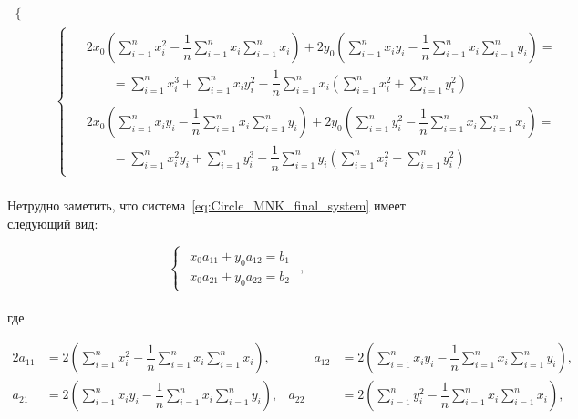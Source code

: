 \begin{align}
\begin{cases}
\begin{aligned}
         \end{aligned}
    \end{cases} \\
    &\begin{cases}
         \label{eq:Circle_MNK_final_system}
         \begin{aligned}
             &2 x_0 \left( \sum_{i=1}^{n} x_i^2 - \dfrac{1}{n} \sum_{i=1}^{n} x_i \sum_{i=1}^{n} x_i \right)
             + 2 y_0 \left( \sum_{i=1}^{n} x_i y_i
             - \dfrac{1}{n} \sum_{i=1}^{n} x_i \sum_{i=1}^{n} y_i \right) = \\
             &\qquad = \sum_{i=1}^{n} x_i^3 + \sum_{i=1}^{n} x_i y_i^2
             - \dfrac{1}{n} \sum_{i=1}^{n} x_i \left( \sum_{i=1}^{n} x_i^2 + \sum_{i=1}^{n} y_i^2 \right) \\
             \\
             &2 x_0 \left( \sum_{i=1}^{n} x_i y_i
             - \dfrac{1}{n} \sum_{i=1}^{n} x_i \sum_{i=1}^{n} y_i \right)
             + 2 y_0 \left( \sum_{i=1}^{n} y_i^2 - \dfrac{1}{n} \sum_{i=1}^{n} x_i \sum_{i=1}^{n} x_i \right) = \\
             &\qquad = \sum_{i=1}^{n} x_i^2 y_i + \sum_{i=1}^{n} y_i^3
             - \dfrac{1}{n} \sum_{i=1}^{n} y_i \left( \sum_{i=1}^{n} x_i^2 + \sum_{i=1}^{n} y_i^2 \right)
         \end{aligned}
    \end{cases}
\end{align} \\

Нетрудно заметить, что система~\ref{eq:Circle_MNK_final_system} имеет следующий вид:

\begin{equation}
    \label{eq:SLAU_system}
    \begin{cases}
        \begin{aligned}
            x_0 a_{11} + y_0 a_{12} = b_1
            \\
            x_0 a_{21} + y_0 a_{22} = b_2
        \end{aligned}
    \end{cases},
\end{equation} \\
где

\begin{alignat*}{2}
    a_{11} &= 2 \left( \sum_{i=1}^{n} x_i^2 - \dfrac{1}{n} \sum_{i=1}^{n} x_i \sum_{i=1}^{n} x_i \right), & \qquad
    a_{12} &= 2 \left( \sum_{i=1}^{n} x_i y_i - \dfrac{1}{n} \sum_{i=1}^{n} x_i \sum_{i=1}^{n} y_i \right), \\
    a_{21} &= 2 \left( \sum_{i=1}^{n} x_i y_i - \dfrac{1}{n} \sum_{i=1}^{n} x_i \sum_{i=1}^{n} y_i \right), &
    a_{22} &= 2 \left( \sum_{i=1}^{n} y_i^2 - \dfrac{1}{n} \sum_{i=1}^{n} x_i \sum_{i=1}^{n} x_i \right),
\end{alignat*} \\

